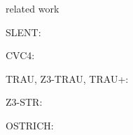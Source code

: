 
related work

SLENT: \cite{WC+18}

CVC4: \cite{cvc4}

TRAU, Z3-TRAU, TRAU+: \cite{Abdulla17,AbdullaA+19}

Z3-STR: \cite{Z3-str}

OSTRICH: \cite{CHL+19}